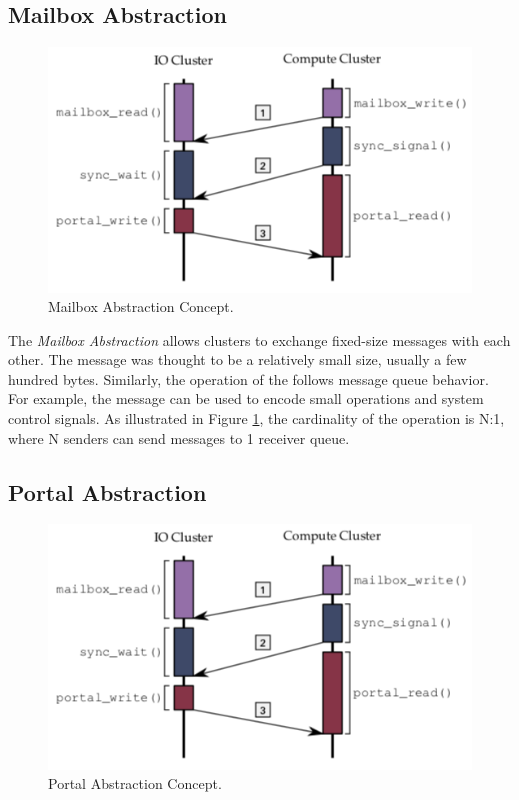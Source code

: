 		\subsection{Mailbox Abstraction}
		\label{sec.mailbox-abs}

			\begin{figure}[h]
				\centering
				\includegraphics[width=.7\textwidth]{images/conceptual-sync.png}

				\caption{
					Mailbox Abstraction Concept.
				}\par
				\label{fig.conpt_mailbox}
			\end{figure}

			The \textit{Mailbox Abstraction} allows clusters to exchange fixed-size
			messages with each other.
			The message was thought to be a relatively small size, usually a few hundred bytes.
			Similarly, the operation of the \mailbox follows \posix message queue behavior.
			For example, the message can be used to encode small operations and system
			control signals.
			As illustrated in Figure \ref{fig.conpt_mailbox}, the cardinality of the operation
			is N:1, where N senders can send messages to 1 receiver queue.

		\subsection{Portal Abstraction}
		\label{sec.portal-abs}

			\begin{figure}[h]
				\centering
				\includegraphics[width=.7\textwidth]{images/conceptual-sync.png}

				\caption{
					Portal Abstraction Concept.
				}\par
				\label{fig.conpt_portal}
			\end{figure}

